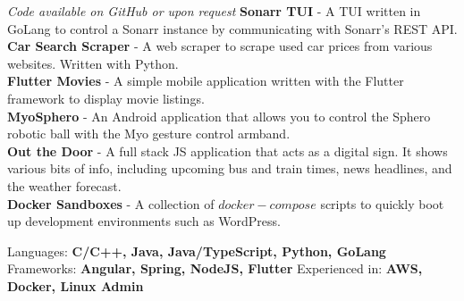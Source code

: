\textit{Code available on GitHub or upon request}
\textbf{Sonarr TUI} - A TUI written in GoLang to control a Sonarr instance 
    by communicating with Sonarr's REST API.\\
\textbf{Car Search Scraper} - A web scraper to scrape used car prices from various
    websites. Written with Python.\\
\textbf{Flutter Movies} - A simple mobile application written with the Flutter
    framework to display movie listings.\\
\textbf{MyoSphero} - An Android application that allows you to control the Sphero robotic ball
    with the Myo gesture control armband.\\
\textbf{Out the Door} - A full stack JS application that acts as a digital sign. It shows
    various bits of info, including upcoming bus and train times, news headlines, and the
    weather forecast.\\
\textbf{Docker Sandboxes} - A collection of $docker-compose$ scripts to quickly boot up
    development environments such as WordPress.



Languages: \textbf{C/C++, Java, Java/TypeScript, Python, GoLang} \\
Frameworks: \textbf{Angular, Spring, NodeJS, Flutter}
Experienced in: \textbf{AWS, Docker, Linux Admin}






